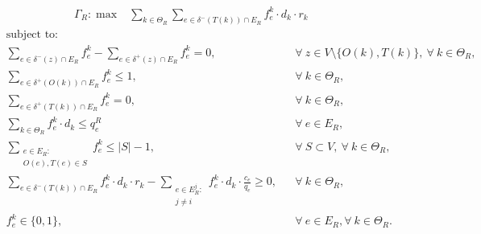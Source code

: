 \documentclass[authoryear]{elsarticle}
\begin{document}
  \begin{align}
        &  \Gamma_R: \max  & \sum_{k \in \Theta_R} \sum_{e \in \delta^-(T(k))\cap E_R}  f_e^k \cdot d_k \cdot r_k &&   
    \end{align}
    \begin{align}
        & \text{subject to:}       && \nonumber\\
        & \sum_{e \in \delta^-(z)\cap E_R} f_e^k-\sum_{e \in \delta^+(z)\cap E_R} f_{e}^k  = 0,           \quad && \forall\ z\in V\setminus\{O(k),T(k)\},\ \forall\ k\in\Theta_R, \\[1em]
& \sum_{e \in \delta^+(O(k))\cap E_R} f_e^k\leq 1, && \forall\ k\in \Theta_R,  \\
& \sum_{e \in \delta^+(T(k))\cap E_R} f_e^k  = 0, && \forall\ k\in \Theta_R,  \\
 & \sum_{k \in \Theta_R} f_e^k\cdot d_k \leq q_e^R   &&\forall\ e \in E_R,   \\
& \sum_{\substack{e\in E_R\colon\\O(e),T(e)\in S }} f_e^k \leq |S| -1,  && \forall\ S \subset V, \ \forall\ k \in \Theta_R, \\
& \sum_{e \in \delta^-(T(k))\cap E_R}  f_e^k  \cdot d_k \cdot r_k -\sum_{\substack{e \in E_R^j\colon \\ j\not = i}} f_e^k \cdot d_k \cdot \frac{c_e}{q_e}\geq 0, && \forall\ k \in \Theta_R, \\
& f_e^k \in \{0,1\},    && \forall\ e \in E_R, \forall\ k \in \Theta_R.
    \end{align}
\end{document}
